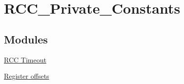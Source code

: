\hypertarget{group___r_c_c___private___constants}{}\section{R\+C\+C\+\_\+\+Private\+\_\+\+Constants}
\label{group___r_c_c___private___constants}
\subsection*{Modules}
\begin{DoxyCompactItemize}
\item 
\hyperlink{group___r_c_c___timeout}{R\+C\+C Timeout}
\item 
\hyperlink{group___r_c_c___register___offset}{Register offsets}
\end{DoxyCompactItemize}
